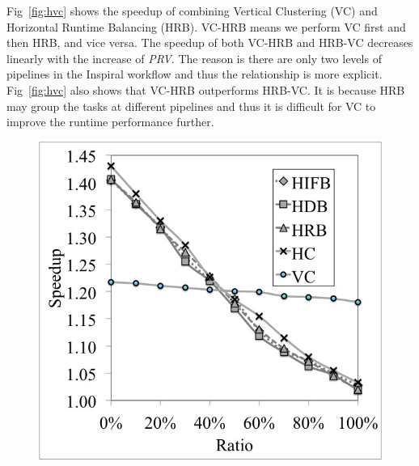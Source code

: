 Fig~\ref{fig:hvc} shows the speedup of combining Vertical Clustering (VC) and Horizontal Runtime Balancing (HRB). VC-HRB means we perform VC first and then HRB, and vice versa. The speedup of both VC-HRB and HRB-VC decreases linearly with the increase of {\em PRV}. The reason is there are only two levels of pipelines in the Inspiral workflow and thus the relationship is more explicit. Fig~\ref{fig:hvc} also shows that VC-HRB outperforms HRB-VC. It is because HRB may group the tasks at different pipelines and thus it is difficult for VC to improve the runtime performance further.

\begin{figure}

\centering
\begin{minipage}{.5\textwidth}
  \centering
  \includegraphics[width=1.0\linewidth]{figures/balance//figure3_1.jpg}
  \label{fig:tradeoff1}
\end{minipage}%
\begin{minipage}{.5\textwidth}
  \centering

\end{minipage}
\end{figure}
